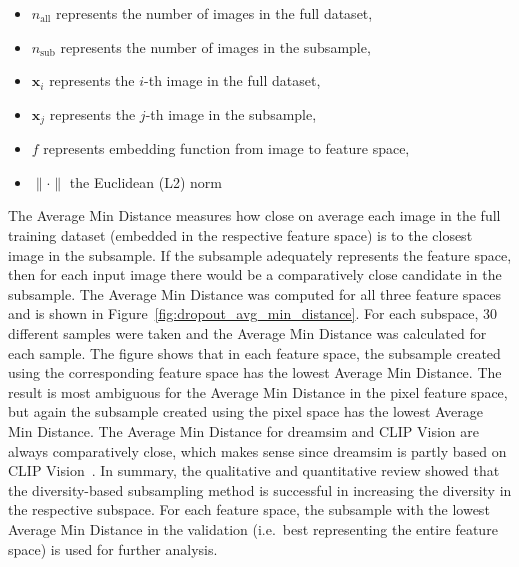 \begin{itemize}
  \item \( n_{\text{all}} \) represents the number of images in the full dataset,
  \item \( n_{\text{sub}} \) represents the number of images in the subsample,
  \item \( \mathbf{x}_i \) represents the $i$-th image in the full dataset,
  \item \( \mathbf{x}_j \) represents the $j$-th image in the subsample,
  \item \( f \) represents embedding function from image to feature space,
  \item \( \|\cdot\| \) the Euclidean (L2) norm
\end{itemize}

\noindent{}The Average Min Distance measures how close on average each image in the full training dataset (embedded in the respective feature space) is to the closest image in the subsample. If the subsample adequately represents the feature space, then for each input image there would be a comparatively close candidate in the subsample. The Average Min Distance was computed for all three feature spaces and is shown in Figure~\ref{fig:dropout_avg_min_distance}. For each subspace, 30 different samples were taken and the Average Min Distance was calculated for each sample. The figure shows that in each feature space, the subsample created using the corresponding feature space has the lowest Average Min Distance. The result is most ambiguous for the Average Min Distance in the pixel feature space, but again the subsample created using the pixel space has the lowest Average Min Distance. The Average Min Distance for dreamsim and CLIP Vision are always comparatively close, which makes sense since dreamsim is partly based on CLIP Vision~\cite{fuDreamSimLearningNew2023}. In summary, the qualitative and quantitative review showed that the diversity-based subsampling method is successful in increasing the diversity in the respective subspace. For each feature space, the subsample with the lowest Average Min Distance in the validation (i.e.\ best representing the entire feature space) is used for further analysis.
 

